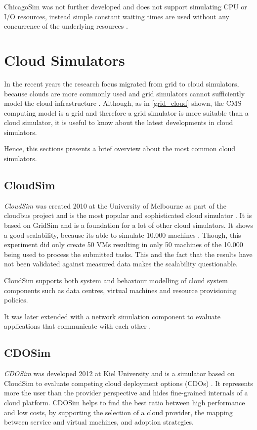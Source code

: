ChicagoSim was not further developed and does not support simulating CPU or I/O resources, instead simple constant waiting times are used without any concurrence of the underlying resources \cite{chicagosim}. 


\newpage
\section{Cloud Simulators}
In the recent years the research focus migrated from grid to cloud simulators, because clouds are more commonly used and grid simulators cannot sufficiently model the cloud infrastructure \cite{compare_grid_cloud}. Although, as in \cref{grid_cloud} shown, the CMS computing model is a grid and therefore a grid simulator is more suitable than a cloud simulator, it is useful to know about the latest developments in cloud simulators. 

Hence, this sections presents a brief overview about the most common cloud simulators.

\subsection{CloudSim}
\textit{CloudSim} was created 2010 at the University of Melbourne as part of the cloudbus project and is the most popular and sophisticated cloud simulator \cite{compare_grid_cloud}. It is based on GridSim and is a foundation for a lot of other cloud simulators.
It shows a good scalability, because its able to simulate 10.000 machines \cite{cloud_sim}. Though, this experiment did only create 50 VMs resulting in only 50 machines of the 10.000 being used to process the submitted tasks. 
This and the fact that the results have not been validated against measured data makes the scalability questionable.

CloudSim supports both system and behaviour modelling of cloud system components such as data centres, virtual machines and resource provisioning policies.

It was later extended with a network simulation component to evaluate applications that communicate with each other \cite{networkcloudsim}.

\subsection{CDOSim}
\textit{CDOSim} was developed 2012 at Kiel University and is a simulator based on CloudSim to evaluate competing cloud deployment options (CDOs) \cite{cdosim}. It represents more the user than the provider perspective and hides fine-grained internals of a cloud platform. CDOSim helps to find the best ratio between high performance and low costs, by supporting the selection of a cloud provider, the mapping between service and virtual machines, and adoption strategies. 

